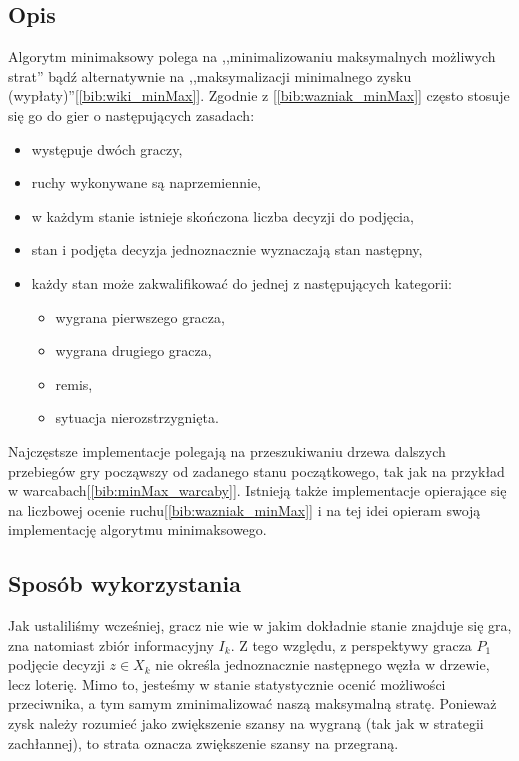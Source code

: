 \subsection{Opis}
Algorytm minimaksowy polega na ,,minimalizowaniu maksymalnych możliwych strat'' bądź alternatywnie na ,,maksymalizacji minimalnego zysku (wypłaty)''[\ref{bib:wiki_minMax}]. Zgodnie z [\ref{bib:wazniak_minMax}] często stosuje się go do gier o następujących zasadach:
\begin{itemize}
	\item występuje dwóch graczy,
	\item ruchy wykonywane są naprzemiennie,
	\item w każdym stanie istnieje skończona liczba decyzji do podjęcia,
	\item stan i podjęta decyzja jednoznacznie wyznaczają stan następny,
	\item każdy stan może zakwalifikować do jednej z następujących kategorii:
	\begin{itemize}
		\item wygrana pierwszego gracza,
		\item wygrana drugiego gracza,
		\item remis,
		\item sytuacja nierozstrzygnięta.
	\end{itemize}
\end{itemize}
Najczęstsze implementacje polegają na przeszukiwaniu drzewa dalszych przebiegów gry począwszy od zadanego stanu początkowego, tak jak na przykład w warcabach[\ref{bib:minMax_warcaby}]. Istnieją także implementacje opierające się na liczbowej ocenie ruchu[\ref{bib:wazniak_minMax}] i na tej idei opieram swoją implementację algorytmu minimaksowego.

\subsection{Sposób wykorzystania}
Jak ustaliliśmy wcześniej, gracz nie wie w jakim dokładnie stanie znajduje się gra, zna natomiast zbiór informacyjny $I_k$. Z tego względu, z perspektywy gracza $P_1$ podjęcie decyzji $z \in X_k$ nie określa jednoznacznie następnego węzła w drzewie, lecz loterię. Mimo to, jesteśmy w stanie statystycznie ocenić możliwości przeciwnika, a tym samym zminimalizować naszą maksymalną stratę. Ponieważ zysk należy rozumieć jako zwiększenie szansy na wygraną (tak jak w strategii zachłannej), to strata oznacza zwiększenie szansy na przegraną. 

